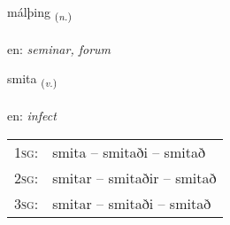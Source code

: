 \documentclass[frontgrid, backgrid]{flacards}\usepackage[]{graphicx}\usepackage[]{xcolor}
\begin{document}
\renewcommand{\flhead}{\vskip5pt \fboxsep=0pt {\small\bfseries\footnotesize Nafnorð | Noun}}
\renewcommand{\fcfoot}{\vskip5pt \fboxsep=0pt \hspace{2pt}{\small\bfseries\footnotesize 3K}}

\renewcommand{\blhead}{\vskip5pt {\small\bfseries\footnotesize Nafnorð | Noun }}
\renewcommand{\bcfoot}{\vskip5pt \hspace{2pt}{\small\bfseries\footnotesize 3K}}


{málþing \small{\textsubscript{(\textit{n.})}} \\[1ex] %
\textphonetic{[maulθiŋk]} \\
en: \emph{seminar, forum} \\  [2ex]
\renewcommand*{\arraystretch}{0.8}
}

\renewcommand{\flhead}{\vskip5pt \fboxsep=0pt {\small\bfseries\footnotesize Sagnorð | Verb}}
\renewcommand{\fcfoot}{\vskip5pt \fboxsep=0pt \hspace{2pt}{\small\bfseries\footnotesize 3K}}

\renewcommand{\blhead}{\vskip5pt {\small\bfseries\footnotesize Sagnorð | Verb }}
\renewcommand{\bcfoot}{\vskip5pt \hspace{2pt}{\small\bfseries\footnotesize 3K}}


{smita \small{\textsubscript{(\textit{v.})}} \\[1ex] %
\textphonetic{[smɪːta]} \\
en: \emph{infect} \\  [2ex]
\renewcommand*{\arraystretch}{0.8}
\begin{tabular}{p{1cm}l}
\textsc{1sg}: & smita -- smitaði -- smitað \\ 
\textsc{2sg}: & smitar -- smitaðir -- smitað \\ 
\textsc{3sg}: & smitar -- smitaði -- smitað \\ 
\end{tabular}
}
\end{document}
